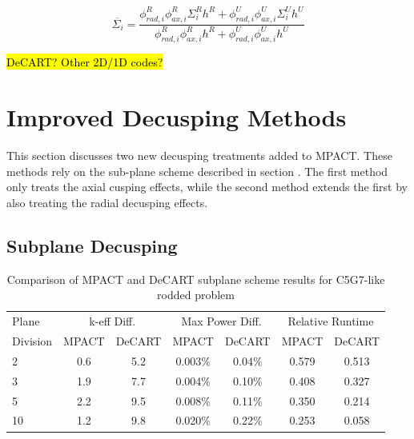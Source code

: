\begin{equation}\label{e:nTRACERdecusping}
\overline{\Sigma_i} = \frac{\phi_{rad,i}^R \phi_{ax,i}^R \Sigma_i^R h^R + \phi_{rad,i}^U \phi_{ax,i}^U \Sigma_i^U h^U}{\phi_{rad,i}^R \phi_{ax,i}^R h^R + \phi_{rad,i}^U \phi_{ax,i}^U h^U}
\end{equation}

\hl{DeCART?  Other 2D/1D codes?}

\section{Improved Decusping Methods}

This section discusses two new decusping treatments added to MPACT.  These methods rely on the sub-plane scheme described in section .  The first method only treats the axial cusping effects, while the second method extends the first by also treating the radial decusping effects.

\subsection{Subplane Decusping}


\begin{table}
\caption{Comparison of MPACT and DeCART subplane scheme results for C5G7-like rodded problem}
\begin{center}
\begin{tabular}{|l|c|c|c|c|c|c|}\hline
Plane & \multicolumn{2}{|c|}{k-eff Diff.} & \multicolumn{2}{|c|}{Max Power Diff.} & \multicolumn{2}{|c|}{Relative Runtime} \\ \cline{2-7}
Division & MPACT & DeCART & MPACT & DeCART & MPACT & DeCART \\ \hline
2 & 0.6 & 5.2 & 0.003\% & 0.04\% & 0.579 & 0.513 \\ \hline
3 & 1.9 & 7.7 & 0.004\% & 0.10\% & 0.408 & 0.327 \\ \hline
5 & 2.2 & 9.5 & 0.008\% & 0.11\% & 0.350 & 0.214 \\ \hline
10 & 1.2 & 9.8 & 0.020\% & 0.22\% & 0.253 & 0.058 \\ \hline
\end{tabular}
\end{center}
\end{table}

